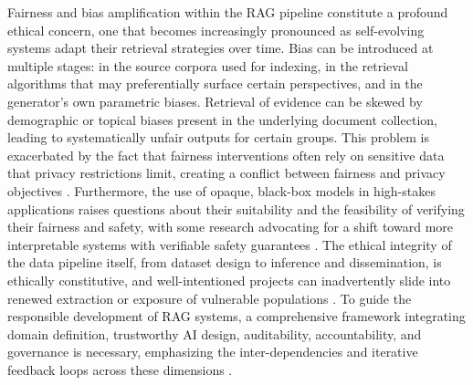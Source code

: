 \documentclass[11pt]{article}
\begin{document}
Fairness and bias amplification within the RAG pipeline constitute a profound ethical concern, one that becomes increasingly pronounced as self-evolving systems adapt their retrieval strategies over time. Bias can be introduced at multiple stages: in the source corpora used for indexing, in the retrieval algorithms that may preferentially surface certain perspectives, and in the generator's own parametric biases. Retrieval of evidence can be skewed by demographic or topical biases present in the underlying document collection, leading to systematically unfair outputs for certain groups. This problem is exacerbated by the fact that fairness interventions often rely on sensitive data that privacy restrictions limit, creating a conflict between fairness and privacy objectives \cite{ref620}. Furthermore, the use of opaque, black-box models in high-stakes applications raises questions about their suitability and the feasibility of verifying their fairness and safety, with some research advocating for a shift toward more interpretable systems with verifiable safety guarantees \cite{ref613}. The ethical integrity of the data pipeline itself, from dataset design to inference and dissemination, is ethically constitutive, and well-intentioned projects can inadvertently slide into renewed extraction or exposure of vulnerable populations \cite{ref621}. To guide the responsible development of RAG systems, a comprehensive framework integrating domain definition, trustworthy AI design, auditability, accountability, and governance is necessary, emphasizing the inter-dependencies and iterative feedback loops across these dimensions \cite{ref622}.
\end{document}
